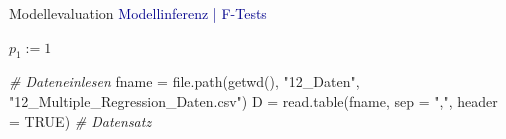 \documentclass[
  8pt,
  ignorenonframetext,
]{beamer}
\newenvironment{Shaded}{\begin{snugshade}}{\end{snugshade}}
\newcommand{\AttributeTok}[1]{\textcolor[rgb]{0.77,0.63,0.00}{#1}}
\newcommand{\CommentTok}[1]{\textcolor[rgb]{0.56,0.35,0.01}{\textit{#1}}}
\newcommand{\ConstantTok}[1]{\textcolor[rgb]{0.00,0.00,0.00}{#1}}
\newcommand{\FunctionTok}[1]{\textcolor[rgb]{0.00,0.00,0.00}{#1}}
\newcommand{\NormalTok}[1]{#1}
\newcommand{\OtherTok}[1]{\textcolor[rgb]{0.56,0.35,0.01}{#1}}
\newcommand{\StringTok}[1]{\textcolor[rgb]{0.31,0.60,0.02}{#1}}
\begin{document}
\begin{frame}[fragile]{Modellevaluation}
\protect\hypertarget{modellevaluation-4}{}
\textcolor{darkblue}{Modellinferenz | F-Tests}

\small

\(p_1 := 1\)

\tiny
{}
\vspace{1mm}

\begin{Shaded}
\begin{Highlighting}[]
\CommentTok{\# Dateneinlesen}
\NormalTok{fname      }\OtherTok{=} \FunctionTok{file.path}\NormalTok{(}\FunctionTok{getwd}\NormalTok{(), }\StringTok{"12\_Daten"}\NormalTok{, }\StringTok{"12\_Multiple\_Regression\_Daten.csv"}\NormalTok{)}
\NormalTok{D          }\OtherTok{=} \FunctionTok{read.table}\NormalTok{(fname, }\AttributeTok{sep =} \StringTok{","}\NormalTok{, }\AttributeTok{header =} \ConstantTok{TRUE}\NormalTok{)      }\CommentTok{\# Datensatz}


\end{Highlighting}
\end{Shaded}
\end{frame}
\end{document}
